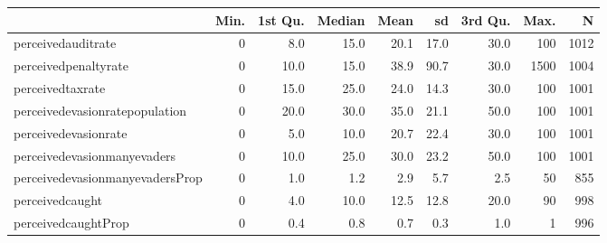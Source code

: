\begin{table}[ht]
\centering
\begin{tabular}{lrrrrrrrr}
  \hline
 & Min. & 1st Qu. & Median & Mean & sd & 3rd Qu. & Max. & N \\ 
  \hline
perceivedauditrate &  0 & 8.0 & 15.0 & 20.1 & 17.0 & 30.0 & 100 & 1012 \\ 
  perceivedpenaltyrate &  0 & 10.0 & 15.0 & 38.9 & 90.7 & 30.0 & 1500 & 1004 \\ 
  perceivedtaxrate &  0 & 15.0 & 25.0 & 24.0 & 14.3 & 30.0 & 100 & 1001 \\ 
  perceivedevasionratepopulation &  0 & 20.0 & 30.0 & 35.0 & 21.1 & 50.0 & 100 & 1001 \\ 
  perceivedevasionrate &  0 & 5.0 & 10.0 & 20.7 & 22.4 & 30.0 & 100 & 1001 \\ 
  perceivedevasionmanyevaders &  0 & 10.0 & 25.0 & 30.0 & 23.2 & 50.0 & 100 & 1001 \\ 
  perceivedevasionmanyevadersProp &  0 & 1.0 & 1.2 & 2.9 & 5.7 & 2.5 & 50 & 855 \\ 
  perceivedcaught &  0 & 4.0 & 10.0 & 12.5 & 12.8 & 20.0 & 90 & 998 \\ 
  perceivedcaughtProp &  0 & 0.4 & 0.8 & 0.7 & 0.3 & 1.0 &  1 & 996 \\ 
   \hline
\end{tabular}
\end{table}
